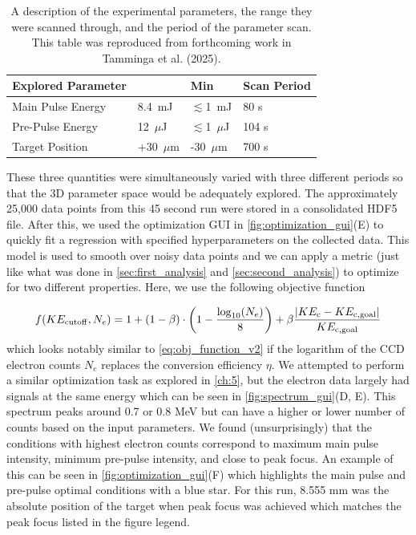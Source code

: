 \begin{table}
	\centering
	\begin{tabular}{|p{4cm}|p{1.5cm}|p{1.5cm}|p{3cm}|}
		\hline
		\textbf{Explored Parameter} & \text{Max} & \textbf{Min} & \textbf{Scan Period}\\
		\hline
		Main Pulse Energy & 8.4~mJ & $\lesssim$1~mJ & 80 s\\
		\hline
		Pre-Pulse Energy & 12~$\mu$J & $\lesssim$1~$\mu$J & 104 s\\
		\hline
		Target Position & +30~$\mu$m & -30~$\mu$m & 700 s\\
		\hline
	\end{tabular}
	\caption{A description of the experimental parameters, the range they were scanned through, and the period of the parameter scan. This table was reproduced from forthcoming work in Tamminga et al. (2025).}
	\label{tab:exp_runs}
\end{table}

These three quantities were simultaneously varied with three different periods so that the 3D parameter space would be adequately explored. The approximately 25,000 data points from this 45 second run were stored in a consolidated \gls{HDF5} file. After this, we used the optimization \gls{GUI} in \autoref{fig:optimization_gui}(E) to quickly fit a regression with specified hyperparameters on the collected data. This model is used to smooth over noisy data points and we can apply a metric (just like what was done in \autoref{sec:first_analysis} and \autoref{sec:second_analysis}) to optimize for two different properties. Here, we use the following objective function

\begin{equation}
	f(KE_{\rm cutoff},N_{e})  =  1 + (1 - \beta) \cdot \left(1 -  \frac{\log_{10}(N_{e})}{8} \right) + \beta \frac{|KE_{\rm c} - KE_{\rm c,goal}|}{KE_{\rm c, goal}} \label{eq:obj_function_daq}
\end{equation}
which looks notably similar to \autoref{eq:obj_function_v2} if the logarithm of the \gls{CCD} electron counts $N_e$ replaces the conversion efficiency $\eta$. We attempted to perform a similar optimization task as explored in \autoref{ch:5}, but the electron data largely had signals at the same energy which can be seen in \autoref{fig:spectrum_gui}(D, E). This spectrum peaks around 0.7 or 0.8 MeV but can have a higher or lower number of counts based on the input parameters. We found (unsurprisingly) that the conditions with highest electron counts correspond to maximum main pulse intensity, minimum pre-pulse intensity, and close to peak focus. An example of this can be seen in \autoref{fig:optimization_gui}(F) which highlights the main pulse and pre-pulse optimal conditions with a blue star. For this run, 8.555 mm was the absolute position of the target when peak focus was achieved which matches the peak focus listed in the figure legend.

